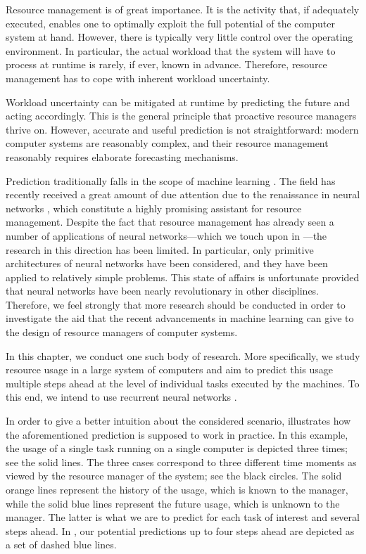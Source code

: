 Resource management is of great importance. It is the activity that, if
adequately executed, enables one to optimally exploit the full potential of the
computer system at hand. However, there is typically very little control over
the operating environment. In particular, the actual workload that the system
will have to process at runtime is rarely, if ever, known in advance. Therefore,
resource management has to cope with inherent workload uncertainty.

Workload uncertainty can be mitigated at runtime by predicting the future and
acting accordingly. This is the general principle that proactive resource
managers thrive on. However, accurate and useful prediction is not
straightforward: modern computer systems are reasonably complex, and their
resource management reasonably requires elaborate forecasting mechanisms.

Prediction traditionally falls in the scope of machine learning
\cite{hastie2013}. The field has recently received a great amount of due
attention due to the renaissance in neural networks \cite{goodfellow2016}, which
constitute a highly promising assistant for resource management. Despite the
fact that resource management has already seen a number of applications of
neural networks---which we touch upon in ---the research in
this direction has been limited. In particular, only primitive architectures of
neural networks have been considered, and they have been applied to relatively
simple problems. This state of affairs is unfortunate provided that neural
networks have been nearly revolutionary in other disciplines. Therefore, we feel
strongly that more research should be conducted in order to investigate the aid
that the recent advancements in machine learning can give to the design of
resource managers of computer systems.

In this chapter, we conduct one such body of research. More specifically, we
study resource usage in a large system of computers and aim to predict this
usage multiple steps ahead at the level of individual tasks executed by the
machines. To this end, we intend to use recurrent neural networks
\cite{goodfellow2016}.

In order to give a better intuition about the considered scenario,
 illustrates how the aforementioned prediction is
supposed to work in practice. In this example, the  usage of a single
task running on a single computer is depicted three times; see the solid lines.
The three cases correspond to three different time moments as viewed by the
resource manager of the system; see the black circles. The solid orange lines
represent the history of the usage, which is known to the manager, while the
solid blue lines represent the future usage, which is unknown to the manager.
The latter is what we are to predict for each task of interest and several steps
ahead. In , our potential predictions up to four steps
ahead are depicted as a set of dashed blue lines.

